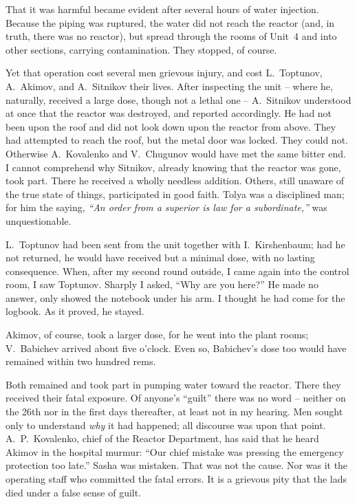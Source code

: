 \documentclass[openright]{bookest}
\begin{document}
That it was harmful became evident after several hours of water injection. Because the piping was ruptured, the water did not reach the reactor (and, in truth, there was no reactor), but spread through the rooms of Unit~4 and into other sections, carrying contamination. They stopped, of course.

Yet that operation cost several men grievous injury, and cost L.~Toptunov, A.~Akimov, and A.~Sitnikov their lives. After inspecting the unit -- where he, naturally, received a large dose, though not a lethal one -- A.~Sitnikov understood at once that the reactor was destroyed, and reported accordingly. He had not been upon the roof and did not look down upon the reactor from above. They had attempted to reach the roof, but the metal door was locked. They could not. Otherwise A.~Kovalenko and V.~Chugunov would have met the same bitter end. I cannot comprehend why Sitnikov, already knowing that the reactor was gone, took part. There he received a wholly needless addition. Others, still unaware of the true state of things, participated in good faith. Tolya was a disciplined man; for him the saying, \textit{``An order from a superior is law for a subordinate,''} was unquestionable.

L.~Toptunov had been sent from the unit together with I.~Kirshenbaum; had he not returned, he would have received but a minimal dose, with no lasting consequence. When, after my second round outside, I came again into the control room, I saw Toptunov. Sharply I asked, ``Why are you here?'' He made no answer, only showed the notebook under his arm. I thought he had come for the logbook. As it proved, he stayed.

Akimov, of course, took a larger dose, for he went into the plant rooms; V.~Babichev arrived about five o'clock. Even so, Babichev's dose too would have remained within two hundred rems.

Both remained and took part in pumping water toward the reactor. There they received their fatal exposure. Of anyone's ``guilt'' there was no word -- neither on the 26th nor in the first days thereafter, at least not in my hearing. Men sought only to understand \textit{why} it had happened; all discourse was upon that point. A.~P.~Kovalenko, chief of the Reactor Department, has said that he heard Akimov in the hospital murmur: ``Our chief mistake was pressing the emergency protection too late.'' Sasha was mistaken. That was not the cause. Nor was it the operating staff who committed the fatal errors. It is a grievous pity that the lads died under a false sense of guilt.
\end{document}
